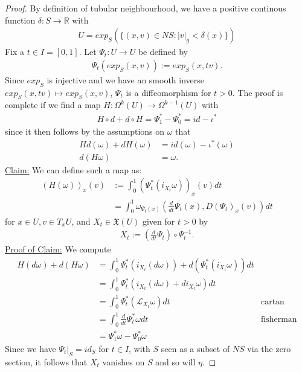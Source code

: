 \begin{proof}
By definition of tubular neighbourhood, we have a positive continous function $\delta : S \to \mathbb{R}$ with 
\begin{align*}
U = exp_S(\{ (x,v) \in NS : |v|_g < \delta(x) \})
\end{align*}
Fix a $t \in I =[0,1]$. Let $\Psi_t: U \to U$ be defined by
\begin{align*}
\Psi_t(exp_S(x,v)) := exp_S(x,tv) .
\end{align*}
Since $exp_S$ is injective and we have an smooth inverse $exp_S(x,tv) \mapsto exp_S(x,v)$, $\Psi_t$ is a diffeomorphism for $t>0$.
The proof is complete if we find a map $H: \Omega^k(U) \to \Omega^{k-1}(U)$  with
\begin{align*}
H \circ d + d \circ H = \Psi^*_1 - \Psi^*_0 = id - \iota^*
\end{align*}
since it then follows by the assumptions on $\omega$ that
\begin{align*}
H  d(\omega) + d  H(\omega) &= id(\omega) - \iota^*(\omega) \\
d(H\omega) &= \omega .
\end{align*} 
\underline{Claim:} We can define such a map as:
\begin{align*}
(H(\omega))_x(v) &:= \int^1_0 (\Psi^*_t(i_{X_t} \omega))_x(v) dt \\
&= \int^1_0 \omega_{\Psi_t(x)} \left( \frac{d}{dt} \Psi_t(x), D(\Psi_t)_x(v) \right) dt
\end{align*}
for $x\in U , v\in T_xU$, and $X_t \in \mathfrak{X}(U)$ given for $t>0$ by
\begin{align*}
X_t := \left( \frac{d}{dt} \Psi_t \right) \circ \Psi^{-1}_t .
\end{align*}
\underline{Proof of Claim:}
We compute
\begin{align*}
H(d\omega) + d(H\omega) &= \int^1_0 \Psi^*_t(i_{X_t}(d\omega))+ d(\Psi^*_t(i_{X_t}\omega)) dt & \\
&= \int^1_0 \Psi^*_t(i_{X_t}(d\omega) + d i_{X_t}\omega) dt &  \\
&= \int^1_0 \Psi^*_t (\mathcal{L}_{X_t} \omega) dt & \text{cartan} \\
&= \int^1_0 \frac{d}{dt} \Psi^*_t \omega dt & \text{fisherman}\\
&= \Psi^*_1 \omega - \Psi^*_0 \omega 
\end{align*}
Since we have $\Psi_t|_S = id_S$ for $t \in I$, with $S$ seen as a subset of $NS$ via the zero section, it follows that $X_t$ vanishes on $S$ and so will $\eta$.
\end{proof}

